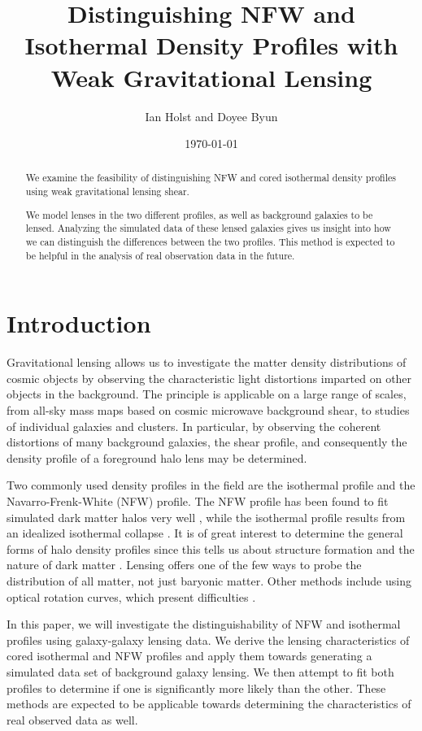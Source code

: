 \documentclass[10pt]{article}
\begin{document}
\title{Distinguishing NFW and Isothermal Density Profiles with Weak Gravitational Lensing}
\author{Ian Holst and Doyee Byun}
\date{\today}
\maketitle

\begin{abstract}
We examine the feasibility of distinguishing NFW and cored isothermal density profiles using weak gravitational lensing shear.

We model lenses in the two different profiles, as well as background galaxies to be lensed.
Analyzing the simulated data of these lensed galaxies gives us insight into how we can distinguish the differences between the two profiles.
This method is expected to be helpful in the analysis of real observation data in the future.
\end{abstract}


\section{Introduction}
Gravitational lensing allows us to investigate the matter density distributions of cosmic objects by observing the characteristic light distortions imparted on other objects in the background. The principle is applicable on a large range of scales, from all-sky mass maps based on cosmic microwave background shear, to studies of individual galaxies and clusters. In particular, by observing the coherent distortions of many background galaxies, the shear profile, and consequently the density profile of a foreground halo lens may be determined.

Two commonly used density profiles in the field are the isothermal profile and the Navarro-Frenk-White (NFW) profile. The NFW profile has been found to fit simulated dark matter halos very well \citep{Navarro1997}, while the isothermal profile results from an idealized isothermal collapse \citep{Shapiro1999}. It is of great interest to determine the general forms of halo density profiles since this tells us about structure formation and the nature of dark matter \citep{Frenk2012}. Lensing offers one of the few ways to probe the distribution of all matter, not just baryonic matter. Other methods include using optical rotation curves, which present difficulties \citep{Jimenez2003}.

In this paper, we will investigate the distinguishability of NFW and isothermal profiles using galaxy-galaxy lensing data. We derive the lensing characteristics of cored isothermal and NFW profiles and apply them towards generating a simulated data set of background galaxy lensing. We then attempt to fit both profiles to determine if one is significantly more likely than the other. These methods are expected to be applicable towards determining the characteristics of real observed data as well.
\end{document}
